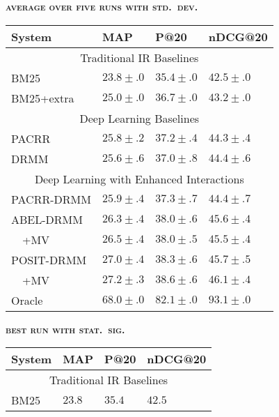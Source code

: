 \documentclass[11pt,a4paper]{article}
\begin{document}
\begin{table*}[t]
\footnotesize
\begin{minipage}{3.15in}
\begin{center}
\textbf{\textsc{{\normalsize average over five runs with std.\ dev.}}}\\
\vspace{0.2em}
\begin{tabular}{|llll|}
\hline
{\bf System}& {\bf MAP}    & {\bf P@20}   & {\bf nDCG@20} \\ \hline
\multicolumn{4}{|c|}{Traditional IR Baselines} \\ \hline
BM25        & $23.8\pm.0$ & $35.4\pm.0$ & $42.5\pm.0$ \\
BM25+extra  & $25.0\pm.0$ & $36.7\pm.0$ & $43.2\pm.0$ \\ \hline
\multicolumn{4}{|c|}{Deep Learning Baselines} \\ \hline
PACRR       & $25.8\pm.2$ & $37.2\pm.4$ & $44.3\pm.4$ \\
DRMM        & $25.6\pm.6$ & $37.0\pm.8$ & $44.4\pm.6$\\ \hline
\multicolumn{4}{|c|}{Deep Learning with Enhanced Interactions} \\ \hline
PACRR-DRMM  & $25.9\pm.4$ & $37.3\pm.7$ & $44.4\pm.7$ \\
ABEL-DRMM   & $26.3\pm.4$ & $38.0\pm.6$ & $45.6\pm.4$ \\
$\quad$+MV  & $26.5\pm.4$ & $38.0\pm.5$ & $45.5\pm.4$ \\
POSIT-DRMM  & $27.0\pm.4$ & $38.3\pm.6$ & $45.7\pm.5$\\
$\quad$+MV  & $27.2\pm.3$ & $38.6\pm.6$ & $46.1\pm.4$\\ \hline\hline
Oracle      & $68.0\pm.0$ & $82.1\pm.0$ & $93.1\pm.0$ \\ \hline
\end{tabular}
\end{center}
\end{minipage}
\begin{minipage}{3.1in}
\begin{center}
\textbf{\textsc{{\normalsize best run with stat.\ sig.}}}\\
\vspace{0.2em}
\begin{tabular}{|llll|}
\hline
{\bf System}& {\bf MAP}    & {\bf P@20}   & {\bf nDCG@20} \\ \hline
\multicolumn{4}{|c|}{Traditional IR Baselines} \\ \hline
BM25        & $23.8$ & $35.4$ & $42.5$ \\

\end{tabular}
\end{center}
\end{minipage}
\end{table*}
\end{document}
